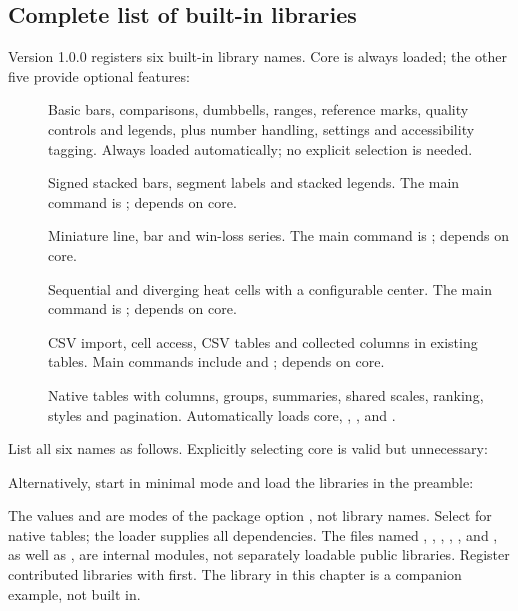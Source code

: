 \subsection{Complete list of built-in libraries}
Version 1.0.0 registers six built-in library names. Core is always loaded;
the other five provide optional features:
\begin{description}
\item[] Basic bars, comparisons, dumbbells, ranges, reference marks,
quality controls and legends, plus number handling, settings and accessibility
tagging. Always loaded automatically; no explicit selection is needed.
\item[] Signed stacked bars, segment labels and stacked legends.
The main command is \key{\gradstack}; depends on core.
\item[] Miniature line, bar and win-loss series.
The main command is \key{\gradspark}; depends on core.
\item[] Sequential and diverging heat cells with a configurable center.
The main command is \key{\gradheat}; depends on core.
\item[] CSV import, cell access, CSV tables and collected columns in
existing tables. Main commands include \key{\gradbarsloadcsv} and
\key{\gradbarscolumn}; depends on core.
\item[] Native  tables with columns, groups, summaries,
shared scales, ranking, styles and pagination. Automatically loads core,
, ,  and .
\end{description}
List all six names as follows. Explicitly selecting core is valid but unnecessary:
\begin{source}
\usepackage[libraries={core,stack,spark,heat,csv,table}]{gradbars}
\end{source}
Alternatively, start in minimal mode and load the libraries in the preamble:
\begin{source}
\usepackage[libraries=none]{gradbars}
\end{source}
The values  and  are modes of the package option
, not library names. Select  for native
tables; the loader supplies all dependencies. The files named ,
, , , , 
and , as well as , are internal modules, not separately loadable public libraries.
Register contributed libraries with \key{\gradbarsdeclarelibrary} first.
The  library in this chapter is a companion example, not built in.

